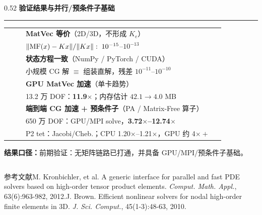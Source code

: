 \documentclass[notheorems]{beamer}
\newcommand{\imglabel}[1]{%
	{\fontsize{8}{10}\selectfont\sffamily\bfseries\color{structure.fg}#1}\par\vspace{2pt}}
\begin{document}
\begin{frame}
\begin{columns}[T, totalwidth=\linewidth]
			\begin{column}{0.52\linewidth}
				\imglabel{验证结果与并行/预条件子基础}
				\vspace{-0.75em}
				{\color{structure.fg!35}\rule{\linewidth}{0.7pt}}\vspace{0.36em}

				{\fontsize{6.45}{8.35}\selectfont\sffamily
				\begin{tabular}{@{}p{0.08\linewidth}p{0.88\linewidth}@{}}
					\circnum{1} & \textbf{MatVec 等价}（2D/3D，不形成 $K_e$）\\
					& $\|{\rm MF}(x)-Kx\|/\|Kx\|:\;10^{-15}$--$10^{-13}$\\[2pt]
					\circnum{2} & \textbf{状态方程一致}（NumPy / PyTorch / CUDA）\\
					& 小规模 CG 解 $\equiv$ 组装直解，残差 $10^{-11}$--$10^{-10}$\\[2pt]
					\circnum{3} & \textbf{GPU MatVec 加速}（单卡趋势）\\
					& 13.2 万 DOF：\textbf{11.9$\times$}；内存估计 $42.1 \to 4.0$ MB\\[2pt]
					\circnum{4} & \textbf{端到端 CG 加速 + 预条件子}（PA / Matrix-Free 算子）\\
					& 650 万 DOF：GPU/MPI solve，\textbf{3.72$\times$--12.74$\times$}\\
					& P2 tet：Jacobi/Cheb.；CPU 1.20$\times$--1.21$\times$，GPU 约 4$\times+$
				\end{tabular}

				\vspace{0.1em}
				\textbf{\color{structure.fg}结果口径：}前期验证：无矩阵链路已打通，并具备 GPU/MPI/预条件子基础。}
			\end{column}
		\end{columns}

		\vspace{0.1em}
		{\fontsize{5.2}{6.6}\selectfont\sffamily\color{structure.fg!60}
			参考文献\quad[1] M. Kronbichler, et al. A generic interface for parallel and fast PDE solvers based on high-order tensor product elements. \textit{Comput. Math. Appl.}, 63(6):963-982, 2012.\quad[2] J. Brown. Efficient nonlinear solvers for nodal high-order finite elements in 3D. \textit{J. Sci. Comput.}, 45(1-3):48-63, 2010.\par}
	\end{frame}
\end{document}
